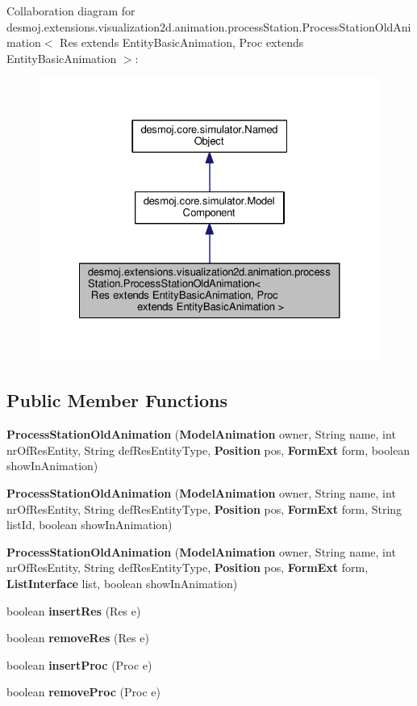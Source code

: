 Collaboration diagram for desmoj.\-extensions.\-visualization2d.\-animation.\-process\-Station.\-Process\-Station\-Old\-Animation$<$ Res extends Entity\-Basic\-Animation, Proc extends Entity\-Basic\-Animation $>$\-:
\nopagebreak
\begin{figure}[H]
\begin{center}
\leavevmode
\includegraphics[width=326pt]{classdesmoj_1_1extensions_1_1visualization2d_1_1animation_1_1process_station_1_1_process_station6af8e441a09d93e2107242b559dd9ede}
\end{center}
\end{figure}
\subsection*{Public Member Functions}
\begin{DoxyCompactItemize}
\item 
{\bf Process\-Station\-Old\-Animation} ({\bf Model\-Animation} owner, String name, int nr\-Of\-Res\-Entity, String def\-Res\-Entity\-Type, {\bf Position} pos, {\bf Form\-Ext} form, boolean show\-In\-Animation)
\item 
{\bf Process\-Station\-Old\-Animation} ({\bf Model\-Animation} owner, String name, int nr\-Of\-Res\-Entity, String def\-Res\-Entity\-Type, {\bf Position} pos, {\bf Form\-Ext} form, String list\-Id, boolean show\-In\-Animation)
\item 
{\bf Process\-Station\-Old\-Animation} ({\bf Model\-Animation} owner, String name, int nr\-Of\-Res\-Entity, String def\-Res\-Entity\-Type, {\bf Position} pos, {\bf Form\-Ext} form, {\bf List\-Interface} list, boolean show\-In\-Animation)
\item 
boolean {\bf insert\-Res} (Res e)
\item 
boolean {\bf remove\-Res} (Res e)
\item 
boolean {\bf insert\-Proc} (Proc e)
\item 
boolean {\bf remove\-Proc} (Proc e)
\end{DoxyCompactItemize}
